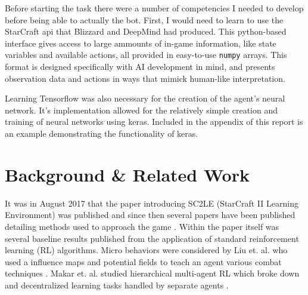 \documentclass{amsart}
\theoremstyle{definition}
\begin{document}
Before starting the task there were a number of competencies I needed to develop before being able to actually the bot.
First, I would need to learn to use the StarCraft api that Blizzard and DeepMind had produced.
This python-based interface gives access to large ammounts of in-game information, like state variables and available actions, all provided in easy-to-use {\tt numpy} arrays.
This format is designed specifically with AI development in mind, and presents observation data and actions in ways that mimick human-like interpretation.

Learning Tensorflow was also necessary for the creation of the agent's neural network.
It's implementation allowed for the relatively simple creation and training of neural networks using keras.
Included in the appendix of this report is an example demonstrating the functionality of keras.








\section{Background \& Related Work}


It was in August 2017 that the paper introducing SC2LE (StarCraft II Learning Environment) was published and since then several papers have been published detailing methods used to approach the game \cite{vinyals2017starcraft}.
Within the paper itself was several baseline results published from the application of standard reinforcement learning (RL) algorithms.
Micro behaviors were considered by Liu et. al. who used a influence maps and potential fields to teach an agent various combat techniques \cite{liu2016evolving}.
Makar et. al. studied hierarchical multi-agent RL which broke down and decentralized learning tasks handled by separate agents \cite{makar2001hierarchical}.
\end{document}
